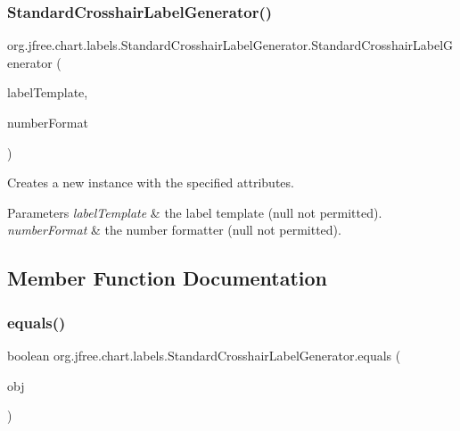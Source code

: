 \subsubsection{\texorpdfstring{Standard\+Crosshair\+Label\+Generator()}{StandardCrosshairLabelGenerator()}\hspace{0.1cm}{\footnotesize\ttfamily [2/2]}}
{\footnotesize\ttfamily org.\+jfree.\+chart.\+labels.\+Standard\+Crosshair\+Label\+Generator.\+Standard\+Crosshair\+Label\+Generator (\begin{DoxyParamCaption}\item[{String}]{label\+Template,  }\item[{Number\+Format}]{number\+Format }\end{DoxyParamCaption})}

Creates a new instance with the specified attributes.


\begin{DoxyParams}{Parameters}
{\em label\+Template} & the label template ({\ttfamily null} not permitted). \\
\hline
{\em number\+Format} & the number formatter ({\ttfamily null} not permitted). \\
\hline
\end{DoxyParams}


\subsection{Member Function Documentation}
\mbox{\label{classorg_1_1jfree_1_1chart_1_1labels_1_1_standard_crosshair_label_generator_a97cb21b24a1c1c4f3c7d94afb77b971a}} 
\subsubsection{\texorpdfstring{equals()}{equals()}}
{\footnotesize\ttfamily boolean org.\+jfree.\+chart.\+labels.\+Standard\+Crosshair\+Label\+Generator.\+equals (\begin{DoxyParamCaption}\item[{Object}]{obj }\end{DoxyParamCaption})}

